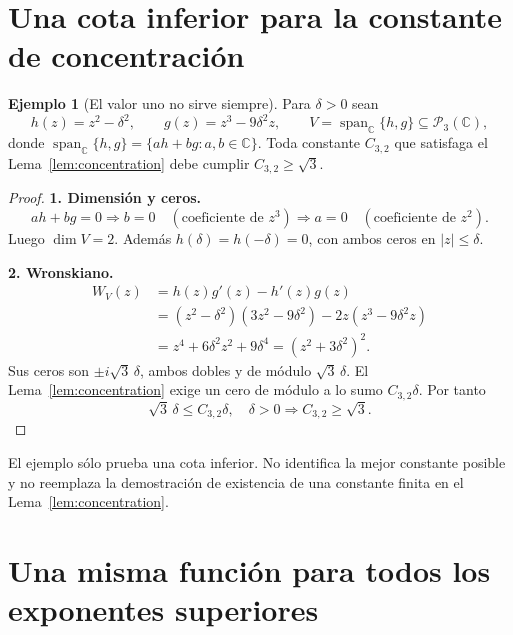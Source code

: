 \documentclass[11pt,a4paper]{article}
\numberwithin{equation}{section}
\theoremstyle{definition}
\newtheorem{example}[theorem]{Ejemplo}
\theoremstyle{remark}
\newcommand{\C}{\mathbb C}
\newcommand{\PP}{\mathcal P}
\DeclareMathOperator{\spanop}{span}
\newcommand{\paso}[1]{\par\smallskip\noindent\textbf{#1}\quad}
\begin{document}
\clearpage
\appendix

\section{Una cota inferior para la constante de concentración}\label{app:constant}

\begin{example}[El valor uno no sirve siempre]\label{ex:constant}
Para $\delta>0$ sean
\[
h(z)=z^2-\delta^2,\qquad g(z)=z^3-9\delta^2z,\qquad
V=\spanop_\C\{h,g\}\subseteq\PP_3(\C),
\]
donde $\spanop_\C\{h,g\}=\{ah+bg:a,b\in\C\}$. Toda constante $C_{3,2}$ que satisfaga el Lema~\ref{lem:concentration} debe cumplir $C_{3,2}\ge\sqrt3$.
\end{example}
\begin{proof}
\paso{1. Dimensión y ceros.}
\[
a h+b g=0\Longrightarrow b=0\quad(\text{coeficiente de }z^3)
\Longrightarrow a=0\quad(\text{coeficiente de }z^2).
\]
Luego $\dim V=2$. Además $h(\delta)=h(-\delta)=0$, con ambos ceros en $|z|\le\delta$.
\paso{2. Wronskiano.}
\begin{align*}
W_V(z)&=h(z)g'(z)-h'(z)g(z)\\
&=(z^2-\delta^2)(3z^2-9\delta^2)-2z(z^3-9\delta^2z)\\
&=z^4+6\delta^2z^2+9\delta^4=(z^2+3\delta^2)^2.
\end{align*}
Sus ceros son $\pm i\sqrt3\,\delta$, ambos dobles y de módulo $\sqrt3\,\delta$. El Lema~\ref{lem:concentration} exige un cero de módulo a lo sumo $C_{3,2}\delta$. Por tanto
\[
\sqrt3\,\delta\le C_{3,2}\delta,\quad\delta>0
\Longrightarrow C_{3,2}\ge\sqrt3.
\]
\end{proof}

El ejemplo sólo prueba una cota inferior. No identifica la mejor constante posible y no reemplaza la demostración de existencia de una constante finita en el Lema~\ref{lem:concentration}.

\clearpage
\section{Una misma función para todos los exponentes superiores}\label{app:allp}
\end{document}
